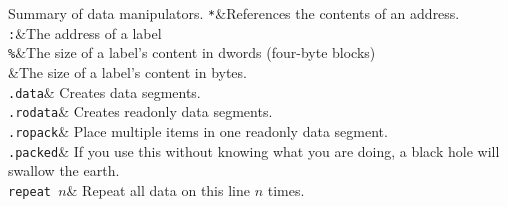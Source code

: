 \documentclass[a4paper,oneside,openany]{book}
\begin{document}
\begin{codetablefig}{Summary of data manipulators.}
\texttt{*}&References the contents of an address.\\
\texttt{:}&The address of a label\\
\texttt{\%}&The size of a label's content in dwords (four-byte blocks)\\
\texttt{\bsz{}}&The size of a label's content in bytes.\\
\texttt{.data}& Creates data segments.\\
\texttt{.rodata}& Creates readonly data segments.\\
\texttt{.ropack}& Place multiple items in one readonly data segment.\\
\texttt{.packed}& If you use this without knowing what you are doing, a black hole will swallow the earth.\\
\texttt{repeat $n$}& Repeat all data on this line $n$ times.\\
\end{codetablefig}
\end{document}
